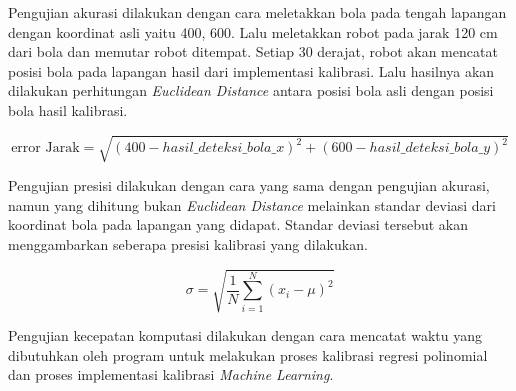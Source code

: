 Pengujian akurasi dilakukan dengan cara meletakkan bola pada tengah lapangan dengan koordinat asli yaitu {400, 600}. Lalu meletakkan robot pada jarak 120 cm dari bola dan memutar robot ditempat. Setiap 30 derajat, robot akan mencatat posisi bola pada lapangan hasil dari implementasi kalibrasi. Lalu hasilnya akan dilakukan perhitungan \emph{Euclidean Distance} antara posisi bola asli dengan posisi bola hasil kalibrasi. 

\begin{equation}
  \text{error Jarak} = \sqrt{(400 - hasil\_deteksi\_bola\_x)^2 + (600 - hasil\_deteksi\_bola\_y)^2}
\end{equation}

Pengujian presisi dilakukan dengan cara yang sama dengan pengujian akurasi, namun yang dihitung bukan \emph{Euclidean Distance} melainkan standar deviasi dari koordinat bola pada lapangan yang didapat. Standar deviasi tersebut akan menggambarkan seberapa presisi kalibrasi yang dilakukan. 

\begin{equation}
  \sigma = \sqrt{\frac{1}{N} \sum_{i=1}^{N} (x_i - \mu)^2}
\end{equation}


Pengujian kecepatan komputasi dilakukan dengan cara mencatat waktu yang dibutuhkan oleh program untuk melakukan proses kalibrasi regresi polinomial dan proses implementasi kalibrasi \emph{Machine Learning}. 
